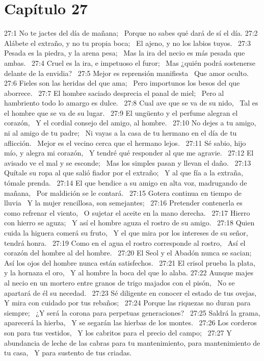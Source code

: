 \section*{Capítulo 27 }

27:1 No te jactes del día de mañana;  
Porque no sabes qué dará de sí el día. 
27:2 Alábete el extraño, y no tu propia boca;  
El ajeno, y no los labios tuyos.  
27:3 Pesada es la piedra, y la arena pesa;  
Mas la ira del necio es más pesada que ambas.  
27:4 Cruel es la ira, e impetuoso el furor;  
Mas ¿quién podrá sostenerse delante de la envidia?  
27:5 Mejor es reprensión manifiesta  
Que amor oculto.  
27:6 Fieles son las heridas del que ama;  
Pero importunos los besos del que aborrece.  
27:7 El hombre saciado desprecia el panal de miel;  
Pero al hambriento todo lo amargo es dulce.  
27:8 Cual ave que se va de su nido,  
Tal es el hombre que se va de su lugar.  
27:9 El ungüento y el perfume alegran el corazón,  
Y el cordial consejo del amigo, al hombre.  
27:10 No dejes a tu amigo, ni al amigo de tu padre;  
Ni vayas a la casa de tu hermano en el día de tu aflicción.  
Mejor es el vecino cerca que el hermano lejos.  
27:11 Sé sabio, hijo mío, y alegra mi corazón,  
Y tendré qué responder al que me agravie.  
27:12 El avisado ve el mal y se esconde;  
Mas los simples pasan y llevan el daño.  
27:13 Quítale su ropa al que salió fiador por el extraño;  
Y al que fía a la extraña, tómale prenda.  
27:14 El que bendice a su amigo en alta voz, madrugando de mañana,  
Por maldición se le contará.  
27:15 Gotera continua en tiempo de lluvia  
Y la mujer rencillosa, son semejantes;  
27:16 Pretender contenerla es como refrenar el viento,  
O sujetar el aceite en la mano derecha.  
27:17 Hierro con hierro se aguza;  
Y así el hombre aguza el rostro de su amigo.  
27:18 Quien cuida la higuera comerá su fruto,  
Y el que mira por los intereses de su señor, tendrá honra.  
27:19 Como en el agua el rostro corresponde al rostro,  
Así el corazón del hombre al del hombre.  
27:20 El Seol y el Abadón nunca se sacian;  
Así los ojos del hombre nunca están satisfechos.  
27:21 El crisol prueba la plata, y la hornaza el oro,  
Y al hombre la boca del que lo alaba. 
27:22 Aunque majes al necio en un mortero entre granos de trigo majados con el pisón,  
No se apartará de él su necedad.  
27:23 Sé diligente en conocer el estado de tus ovejas,  
Y mira con cuidado por tus rebaños;  
27:24 Porque las riquezas no duran para siempre;  
¿Y será la corona para perpetuas generaciones?  
27:25 Saldrá la grama, aparecerá la hierba,  
Y se segarán las hierbas de los montes.  
27:26 Los corderos son para tus vestidos,  
Y los cabritos para el precio del campo;  
27:27 Y abundancia de leche de las cabras para tu mantenimiento, para mantenimiento de tu casa,  
Y para sustento de tus criadas.  
